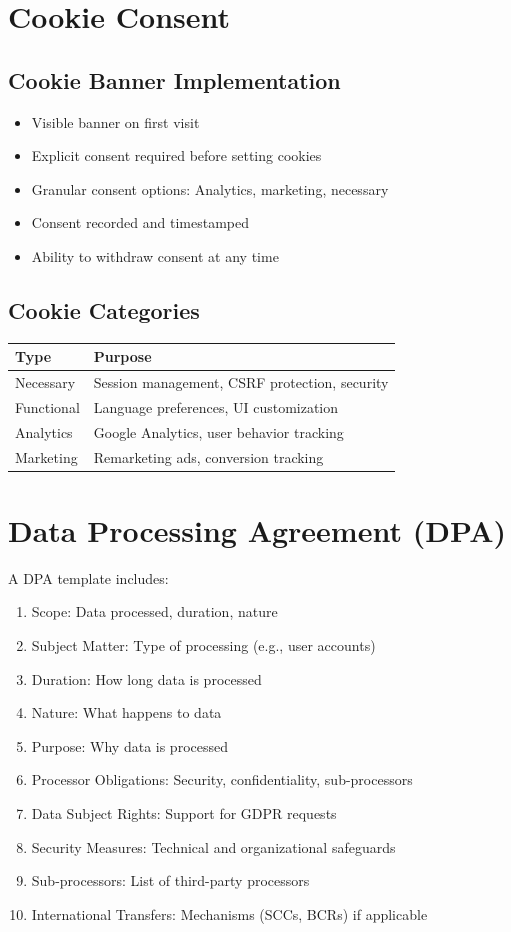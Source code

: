\documentclass{report}
\begin{document}
\section{Cookie Consent}

\subsection{Cookie Banner Implementation}
\begin{itemize}
\item Visible banner on first visit
\item Explicit consent required before setting cookies
\item Granular consent options: Analytics, marketing, necessary
\item Consent recorded and timestamped
\item Ability to withdraw consent at any time
\end{itemize}

\subsection{Cookie Categories}
\begin{table}[h]
\centering
\small
\begin{tabular}{|l|p{4cm}|}
\hline
\textbf{Type} & \textbf{Purpose} \\
\hline
Necessary & Session management, CSRF protection, security \\
\hline
Functional & Language preferences, UI customization \\
\hline
Analytics & Google Analytics, user behavior tracking \\
\hline
Marketing & Remarketing ads, conversion tracking \\
\hline
\end{tabular}
\end{table}

\section{Data Processing Agreement (DPA)}

A DPA template includes:
\begin{enumerate}
\item Scope: Data processed, duration, nature
\item Subject Matter: Type of processing (e.g., user accounts)
\item Duration: How long data is processed
\item Nature: What happens to data
\item Purpose: Why data is processed
\item Processor Obligations: Security, confidentiality, sub-processors
\item Data Subject Rights: Support for GDPR requests
\item Security Measures: Technical and organizational safeguards
\item Sub-processors: List of third-party processors
\item International Transfers: Mechanisms (SCCs, BCRs) if applicable
\end{enumerate}
\end{document}
